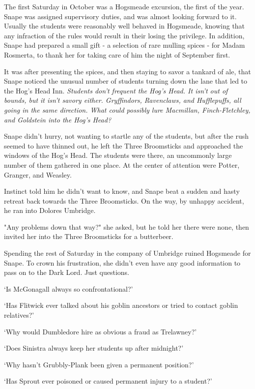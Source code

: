 The first Saturday in October was a Hogsmeade excursion, the first of the year. Snape was assigned supervisory duties, and was almost looking forward to it. Usually the students were reasonably well behaved in Hogsmeade, knowing that any infraction of the rules would result in their losing the privilege. In addition, Snape had prepared a small gift - a selection of rare mulling spices - for Madam Rosmerta, to thank her for taking care of him the night of September first.

It was after presenting the spices, and then staying to savor a tankard of ale, that Snape noticed the unusual number of students turning down the lane that led to the Hog's Head Inn. \emph{Students don't frequent the Hog's Head. It isn't out of bounds, but it isn't savory either. Gryffindors, Ravenclaws, and Hufflepuffs, all going in the same direction. What could possibly lure Macmillan, Finch-Fletchley, and Goldstein into the Hog's Head?}

Snape didn't hurry, not wanting to startle any of the students, but after the rush seemed to have thinned out, he left the Three Broomsticks and approached the windows of the Hog's Head. The students were there, an uncommonly large number of them gathered in one place. At the center of attention were Potter, Granger, and Weasley.

Instinct told him he didn't want to know, and Snape beat a sudden and hasty retreat back towards the Three Broomsticks. On the way, by unhappy accident, he ran into Dolores Umbridge.

"Any problems down that way?" she asked, but he told her there were none, then invited her into the Three Broomsticks for a butterbeer.

Spending the rest of Saturday in the company of Umbridge ruined Hogsmeade for Snape. To crown his frustration, she didn't even have any good information to pass on to the Dark Lord. Just questions.

`Is McGonagall always so confrontational?'

`Has Flitwick ever talked about his goblin ancestors or tried to contact goblin relatives?'

`Why would Dumbledore hire as obvious a fraud as Trelawney?'

`Does Sinistra always keep her students up after midnight?'

`Why hasn't Grubbly-Plank been given a permanent position?'

`Has Sprout ever poisoned or caused permanent injury to a student?'

